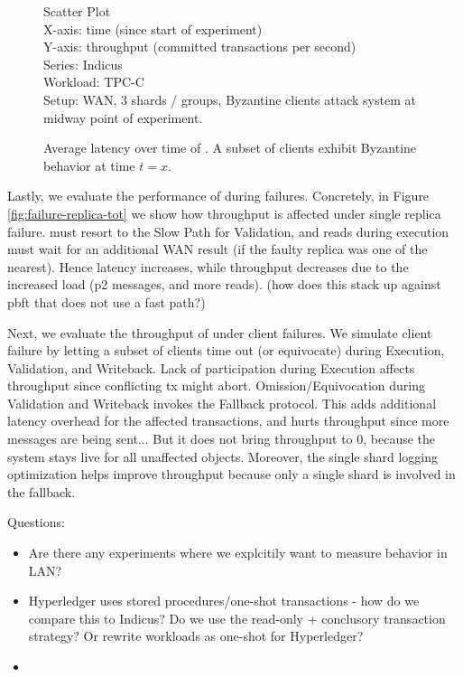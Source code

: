 \begin{figure}
  Scatter Plot\\
  X-axis: time (since start of experiment)\\
  Y-axis: throughput (committed transactions per second)\\
  Series: Indicus\\
  Workload: TPC-C\\
  Setup: WAN, 3 shards / groups, Byzantine clients attack system at midway point
  of experiment.\\
  \caption{Average latency over time of \sys{}. A subset of clients exhibit
  Byzantine behavior at time $t=x$.}
  \label{fig:failure-clients-lot}
\end{figure}

Lastly, we evaluate the performance of \sys during failures. Concretely, in Figure \ref{fig:failure-replica-tot} we show how throughput is affected under single replica failure. \sys must resort to the Slow Path for Validation, and reads during execution must wait for an additional WAN result (if the faulty replica was one of the nearest). Hence latency increases, while throughput decreases due to the increased load (p2 messages, and more reads).
(how does this stack up against pbft that does not use a fast path?)

Next, we evaluate the throughput of \sys under client failures. We simulate client failure by letting a subset of clients time out (or equivocate) during Execution, Validation, and Writeback. Lack of participation during Execution affects throughput since conflicting tx might abort. 
Omission/Equivocation during Validation and Writeback invokes the Fallback protocol. This adds additional latency overhead for the affected transactions, and hurts throughput since more messages are being sent... But it does not bring throughput to 0, because the system stays live for all unaffected objects. Moreover, the single shard logging optimization helps improve throughput because only a single shard is involved in the fallback.




\iffalse
Questions:
\begin{itemize}
  \item Are there any experiments where we explcitily want to measure behavior in LAN?
  \item Hyperledger uses stored procedures/one-shot transactions - how do we compare this to Indicus? Do we use the read-only + conclusory transaction strategy? Or rewrite workloads as one-shot for Hyperledger?
  \item 
\end{itemize}

